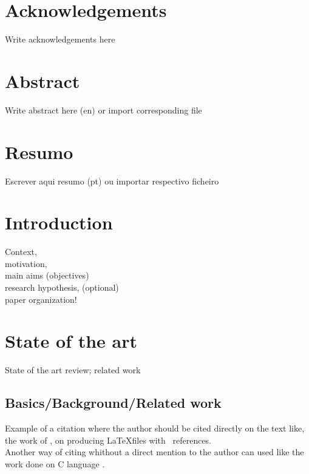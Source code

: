 \documentclass[
  oneside,
  11pt, a4paper,
  footinclude=true,
  headinclude=true,
  cleardoublepage=empty
]{scrbook}
\author{Author of the Thesis}
\date{\myear} %
\begin{document}
	\umfrontcover
	\umtitlepage

	\chapter*{Acknowledgements}
	Write acknowledgements here


	\chapter*{Abstract}
	Write abstract here (en) or import corresponding file

	\cleardoublepage
	\chapter*{Resumo}
	Escrever aqui resumo (pt) ou importar respectivo ficheiro


	\tableofcontents
	\listoffigures
	\listoftables



	\chapter{Introduction}
		Context,\\ motivation,\\ main aims	(objectives) \\ research hypothesis, (optional) \\ paper organization!


	\chapter{State of the art}
		State of the art review; related work

	\section{Basics/Background/Related work}
	Example of a citation where the author should be cited directly on the text like, the work of \cite{GRM97}, on producing \LaTeX files with \Bibtex\ references. \\
	Another way of citing whithout a direct mention to the author can used like the work done on C language \citep{KeR88}.
\end{document}
